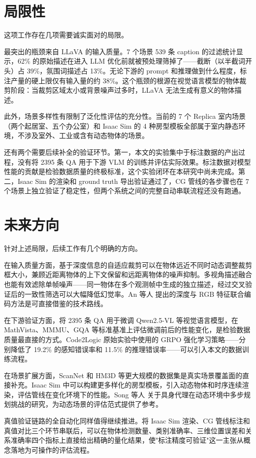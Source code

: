 \section{局限性}

这项工作存在几项需要诚实面对的局限。

最突出的瓶颈来自 LLaVA 的输入质量。7 个场景 539 条 caption 的过滤统计显示，62\% 的原始描述在进入 LLM 优化前就被预处理筛掉了——截断（以半截词开头）占 39\%，氛围词描述占 13\%。无论下游的 prompt 和推理做到什么程度，标注产量的硬上限仅有输入量的约 38\%。这个瓶颈的根源在视觉语言模型的物体裁剪阶段：当裁剪区域太小或背景噪声过多时，LLaVA 无法生成有意义的物体描述。

此外，场景多样性有限制了泛化性评估的充分性。当前的 7 个 Replica 室内场景（两个起居室、五个办公室）和 Isaac Sim 的 4 种房型模板全部属于室内静态环境，不涉及室外、工业或含有动态物体的场景。

还有两个需要后续补全的验证环节。第一，本文的实验集中于标注数据的产出过程，没有将 2395 条 QA 用于下游 VLM 的训练并评估实际效果。标注数据对模型性能的贡献是检验数据质量的终极标准，这个实验闭环在本研究中尚未完成。第二，Isaac Sim 的渲染和 ground truth 导出验证通过了，CG 管线的各步骤也在 7 个场景上独立验证了稳定性，但两个系统之间的完整自动串联流程还没有跑通。

\section{未来方向}

针对上述局限，后续工作有几个明确的方向。

在输入质量方面，基于深度信息的自适应裁剪可以在物体远近不同时动态调整裁剪框大小，兼顾近距离物体的上下文保留和远距离物体的噪声抑制。多视角描述融合也能有效滤除单帧噪声——同一物体在多个观测帧中生成的独立描述，经过交叉验证后的一致性筛选可以大幅降低幻觉率。An 等人\cite{multimodal_3d} 提出的深度与 RGB 特征联合编码方法是可直接借鉴的技术路线。

在下游验证方面，将 2395 条 QA 用于微调 Qwen2.5-VL 等视觉语言模型，在 MathVista、MMMU、GQA 等标准基准上评估微调前后的性能变化，是检验数据质量最直接的方式。Code2Logic 原始实验中使用的 GRPO 强化学习策略\cite{code2logic}——分别降低了 19.2\% 的感知错误率和 11.5\% 的推理错误率——可以引入本文的数据训练流程。

在场景扩展方面，ScanNet 和 HM3D 等更大规模的数据集是真实场景覆盖面的直接补充。Isaac Sim 中可以构建更多样化的房型模板，引入动态物体和时序连续渲染，评估管线在变化环境下的性能。Song 等人\cite{llm_planner} 关于具身代理在动态环境中多步规划挑战的研究，为动态场景的评估范式提供了参考。

真值验证链路的全自动化同样值得继续推进。将 Isaac Sim 渲染、CG 管线标注和真值对比三个环节串联后，可以在物体检测数量、类别准确率、三维位置误差和关系准确率四个指标上直接给出精确的量化结果，使"标注精度可验证"这一主张从概念落地为可操作的评估流程。
